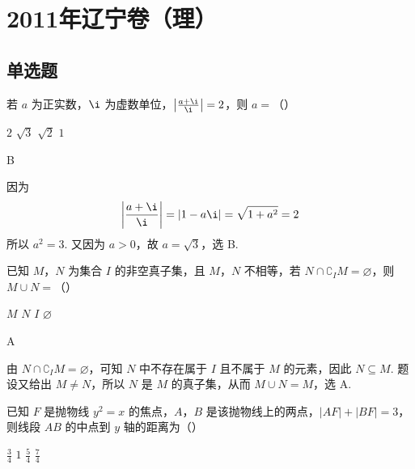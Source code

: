 
\chapter{2011年辽宁卷（理）}

\section{单选题}

\begin{problem}
若 \(a\) 为正实数，\(\i\) 为虚数单位，\(\left|\frac{a + \i}{\i}\right| = 2\)，则 \(a =\)（\quad）

\choices
    {\(2\)}
    {\(\sqrt{3}\)}
    {\(\sqrt{2}\)}
    {\(1\)}
\end{problem}

\begin{answer}
B
\end{answer}

\begin{solution}
因为
\[
\left|\frac{a+\i}{\i}\right|=|1-a\i|=\sqrt{1+a^{2}}=2
\]
所以 \(a^{2}=3\). 又因为 \(a>0\)，故 \(a=\sqrt{3}\)，选 B.
\end{solution}

\begin{problem}
已知 \(M\)，\(N\) 为集合 \(I\) 的非空真子集，且 \(M\)，\(N\) 不相等，若 \(N \cap \complement_I M = \varnothing\)，则 \(M \cup N =\)（\quad）

\choices
    {\(M\)}
    {\(N\)}
    {\(I\)}
    {\(\varnothing\)}
\end{problem}

\begin{answer}
A
\end{answer}

\begin{solution}
由 \(N\cap\complement_I M=\varnothing\)，可知 \(N\) 中不存在属于 \(I\) 且不属于 \(M\) 的元素，因此 \(N\subseteq M\). 题设又给出 \(M\ne N\)，所以 \(N\) 是 \(M\) 的真子集，从而 \(M\cup N=M\)，选 A.
\end{solution}

\begin{problem}
已知 \(F\) 是抛物线 \(y^{2} = x\) 的焦点，\(A\)，\(B\) 是该抛物线上的两点，\(|AF| + |BF| = 3\)，则线段 \(AB\) 的中点到 \(y\) 轴的距离为（\quad）

\choices
    {\( \frac{3}{4} \)}
    {\(1\)}
    {\( \frac{5}{4} \)}
    {\( \frac{7}{4} \)}
\end{problem}

